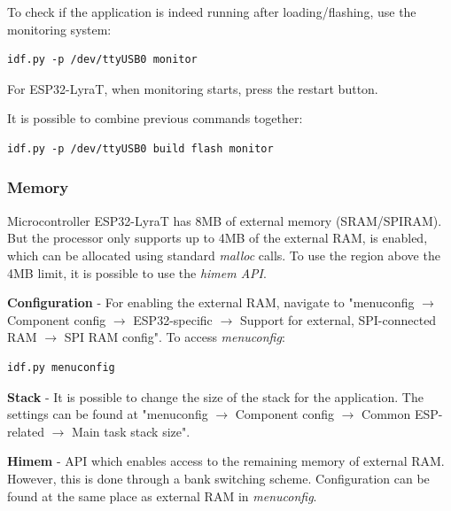 \documentclass[thesis=M,english]{FITthesis}[2019/12/23]
\begin{document}
\bigskip
\noindent
To check if the application is indeed running after loading/flashing, use the monitoring system:
\begin{lstlisting}[frame=single]
idf.py -p /dev/ttyUSB0 monitor
\end{lstlisting}
For ESP32-LyraT, when monitoring starts, press the restart button.

\bigskip
\noindent
It is possible to combine previous commands together:
\begin{lstlisting}[frame=single]
idf.py -p /dev/ttyUSB0 build flash monitor
\end{lstlisting}

\subsubsection{Memory} \label{esp-memory}
Microcontroller ESP32-LyraT has 8MB of external memory (SRAM/SPIRAM). But the processor only supports up to 4MB of the external RAM, is enabled, which can be allocated using standard \textit{malloc} calls. To use the region above the 4MB limit, it is possible to use the \textit{himem API}.

\bigskip
\noindent
\textbf{Configuration} - For enabling the external RAM, navigate to "menuconfig $\rightarrow$ Component config $\rightarrow$ ESP32-specific $\rightarrow$ Support for external, SPI-connected RAM $\rightarrow$ SPI RAM config". To access \textit{menuconfig}:
\begin{lstlisting}[frame=single]
idf.py menuconfig
\end{lstlisting}

\bigskip
\noindent
\textbf{Stack} - It is possible to change the size of the stack for the application. The settings can be found at "menuconfig $\rightarrow$ Component config $\rightarrow$ Common ESP-related $\rightarrow$ Main task stack size".

\bigskip
\noindent
\textbf{Himem} - API which enables access to the remaining memory of external RAM. However, this is done through a bank switching scheme. Configuration can be found at the same place as external RAM in \textit{menuconfig}.

\end{document}
